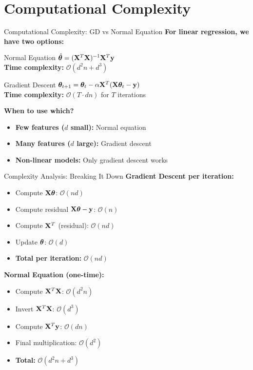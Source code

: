\documentclass[usenames,dvipsnames]{beamer}
\begin{document}
  \section{Computational Complexity}

  \begin{frame}{Computational Complexity: GD vs Normal Equation}
    \textbf{For linear regression, we have two options:}
    
    \begin{alertbox}{Normal Equation}
    $\hat{\boldsymbol{\theta}} = (\mathbf{X}^T\mathbf{X})^{-1}\mathbf{X}^T\mathbf{y}$
    \\\textbf{Time complexity:} $\mathcal{O}(d^2n + d^3)$
    \end{alertbox}
    
    \begin{keypointsbox}{Gradient Descent}
    $\boldsymbol{\theta}_{t+1} = \boldsymbol{\theta}_t - \alpha \mathbf{X}^T(\mathbf{X}\boldsymbol{\theta}_t - \mathbf{y})$
    \\\textbf{Time complexity:} $\mathcal{O}(T \cdot dn)$ for $T$ iterations
    \end{keypointsbox}
    
    \pause
    \textbf{When to use which?}
    \begin{itemize}[<+->]
        \item \textbf{Few features ($d$ small):} Normal equation
        \item \textbf{Many features ($d$ large):} Gradient descent
        \item \textbf{Non-linear models:} Only gradient descent works
    \end{itemize}
  \end{frame}

  \begin{frame}{Complexity Analysis: Breaking It Down}
    \textbf{Gradient Descent per iteration:}
    \begin{itemize}[<+->]
        \item Compute $\mathbf{X}\boldsymbol{\theta}$: $\mathcal{O}(nd)$ 
        \item Compute residual $\mathbf{X}\boldsymbol{\theta} - \mathbf{y}$: $\mathcal{O}(n)$
        \item Compute $\mathbf{X}^T$ (residual): $\mathcal{O}(nd)$
        \item Update $\boldsymbol{\theta}$: $\mathcal{O}(d)$
        \item \textbf{Total per iteration:} $\mathcal{O}(nd)$
    \end{itemize}
    
    \pause
    \textbf{Normal Equation (one-time):}
    \begin{itemize}[<+->]
        \item Compute $\mathbf{X}^T\mathbf{X}$: $\mathcal{O}(d^2n)$
        \item Invert $\mathbf{X}^T\mathbf{X}$: $\mathcal{O}(d^3)$
        \item Compute $\mathbf{X}^T\mathbf{y}$: $\mathcal{O}(dn)$
        \item Final multiplication: $\mathcal{O}(d^2)$
        \item \textbf{Total:} $\mathcal{O}(d^2n + d^3)$
    \end{itemize}
  \end{frame}
\end{document}
